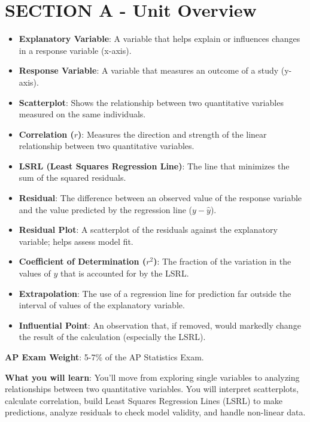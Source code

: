\section{SECTION A - Unit Overview}
\begin{lessonbox}
\begin{itemize}
    \item \textbf{Explanatory Variable}: A variable that helps explain or influences changes in a response variable (x-axis).
    \item \textbf{Response Variable}: A variable that measures an outcome of a study (y-axis).
    \item \textbf{Scatterplot}: Shows the relationship between two quantitative variables measured on the same individuals.
    \item \textbf{Correlation ($r$)}: Measures the direction and strength of the linear relationship between two quantitative variables.
    \item \textbf{LSRL (Least Squares Regression Line)}: The line that minimizes the sum of the squared residuals.
    \item \textbf{Residual}: The difference between an observed value of the response variable and the value predicted by the regression line ($y - \hat{y}$).
    \item \textbf{Residual Plot}: A scatterplot of the residuals against the explanatory variable; helps assess model fit.
    \item \textbf{Coefficient of Determination ($r^2$)}: The fraction of the variation in the values of $y$ that is accounted for by the LSRL.
    \item \textbf{Extrapolation}: The use of a regression line for prediction far outside the interval of values of the explanatory variable.
    \item \textbf{Influential Point}: An observation that, if removed, would markedly change the result of the calculation (especially the LSRL).
\end{itemize}
\end{lessonbox}

\textbf{AP Exam Weight}: 5-7\% of the AP Statistics Exam.

\textbf{What you will learn}: You'll move from exploring single variables to analyzing relationships between two quantitative variables. You will interpret scatterplots, calculate correlation, build Least Squares Regression Lines (LSRL) to make predictions, analyze residuals to check model validity, and handle non-linear data.

